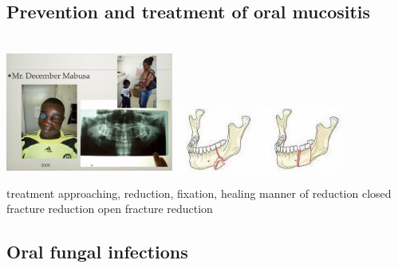 \documentclass[
paper=landscape,
paper=160mm:90mm, %
fontsize=11pt, %
pagesize, %
parskip=half-, %
]{scrartcl} %
\newenvironment{WrapText1}[3][r]
{\wrapfigure[#2]{#1}{#3}}
{\endwrapfigure}
\newcommand{\wrapr}[6]{
\begin{minipage}{\linewidth}\mbox{}\\
\vspace{#1}
\begin{WrapText1}{#2}{#3}
\vspace{#4}#5\end{WrapText1}#6
\end{minipage}}
\theoremstyle{mythmstyle} %
\begin{document}
\clearpage
%
\subsection{Prevention and treatment of oral mucositis}

\wrapr{-8mm}{7}{6cm}{-1mm}
{%
\includegraphics[width=5.5cm]{Mabusa.png}
\includegraphics[width=5.5cm]{reduction_mandible.jpeg}
} %
{%
\begin{outline}
\1 treatment
    \2 approaching, reduction, fixation, healing
\1  manner of reduction
    \2 closed fracture reduction
    \2 open fracture reduction
\end{outline}
} %

\clearpage

\subsection{Oral fungal infections}
\end{document}
